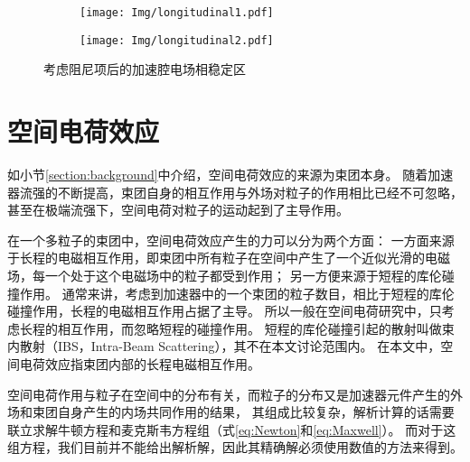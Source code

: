 \begin{figure}[!htb]
    \centering
    \begin{subfigure}[b]{0.48\textwidth}
        \texttt{[image: Img/longitudinal1.pdf]}
    \end{subfigure}
    \begin{subfigure}[b]{0.45\textwidth}
        \texttt{[image: Img/longitudinal2.pdf]}
    \end{subfigure}
    \caption{考虑阻尼项后的加速腔电场相稳定区}
    \label{fig:longitudinal1}
\end{figure}


\section{空间电荷效应}
\label{section:spaceChargeIntro}
如小节\ref{section:background}中介绍，空间电荷效应的来源为束团本身。
随着加速器流强的不断提高，束团自身的相互作用与外场对粒子的作用相比已经不可忽略，
甚至在极端流强下，空间电荷对粒子的运动起到了主导作用。

在一个多粒子的束团中，空间电荷效应产生的力可以分为两个方面：
一方面来源于长程的电磁相互作用，即束团中所有粒子在空间中产生了一个近似光滑的电磁场，每一个处于这个电磁场中的粒子都受到作用；
另一方便来源于短程的库伦碰撞作用。
通常来讲，考虑到加速器中的一个束团的粒子数目，相比于短程的库伦碰撞作用，长程的电磁相互作用占据了主导。
所以一般在空间电荷研究中，只考虑长程的相互作用，而忽略短程的碰撞作用。
短程的库伦碰撞引起的散射叫做束内散射（IBS，Intra-Beam Scattering），其不在本文讨论范围内。
在本文中，空间电荷效应指束团内部的长程电磁相互作用。

空间电荷作用与粒子在空间中的分布有关，而粒子的分布又是加速器元件产生的外场和束团自身产生的内场共同作用的结果，
其组成比较复杂，解析计算的话需要联立求解牛顿方程和麦克斯韦方程组（式\ref{eq:Newton}和\ref{eq:Maxwell}）。
而对于这组方程，我们目前并不能给出解析解，因此其精确解必须使用数值的方法来得到。

